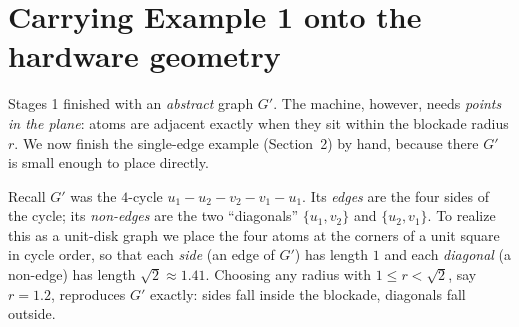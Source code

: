 \documentclass[11pt]{article}
\begin{document}
\section{Carrying Example 1 onto the hardware geometry}
\label{sec:geometry}

Stages 1 finished with an \emph{abstract} graph $G'$. The machine, however, needs
\emph{points in the plane}: atoms are adjacent exactly when they sit within the
blockade radius $r$. We now finish the single-edge example (Section~2) by hand,
because there $G'$ is small enough to place directly.

Recall $G'$ was the $4$-cycle $u_1-u_2-v_2-v_1-u_1$. Its \emph{edges} are the four
sides of the cycle; its \emph{non-edges} are the two ``diagonals''
$\{u_1,v_2\}$ and $\{u_2,v_1\}$. To realize this as a unit-disk graph we place the
four atoms at the corners of a unit square in cycle order, so that each
\emph{side} (an edge of $G'$) has length $1$ and each \emph{diagonal} (a non-edge)
has length $\sqrt{2}\approx 1.41$. Choosing any radius with $1\le r<\sqrt2$, say
$r=1.2$, reproduces $G'$ exactly: sides fall inside the blockade, diagonals fall
outside.

\begin{center}
\end{center}
\end{document}
